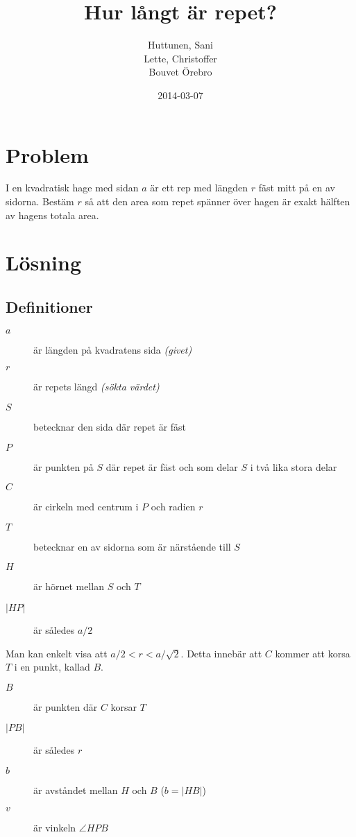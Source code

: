 \documentclass[10pt]{article}
\title{Hur långt är repet?}
\author{Huttunen, Sani\\Lette, Christoffer\\Bouvet Örebro}
\date{2014-03-07}
\begin{document}
  \maketitle

  \section*{Problem}

  I en kvadratisk hage med sidan $a$ är ett rep med längden
  $r$ fäst mitt på en av sidorna. Bestäm $r$ så att den area
  som repet spänner över hagen är exakt hälften av hagens totala area.

  \section*{Lösning}

  \subsection*{Definitioner}

  \begin{description}
    \item[$a$] är längden på kvadratens sida \emph{(givet)}
    \item[$r$] är repets längd \emph{(sökta värdet)}
    \item[$S$] betecknar den sida där repet är fäst
    \item[$P$] är punkten på $S$ där repet är fäst och som delar $S$ i två lika stora delar
    \item[$C$] är cirkeln med centrum i $P$ och radien $r$
    \item[$T$] betecknar en av sidorna som är närstående till $S$
    \item[$H$] är hörnet mellan $S$ och $T$
    \item[$|HP|$] är således $a/2$
  \end{description}

  Man kan enkelt visa att $a/2 < r < a/\sqrt{2}$. Detta innebär att $C$ kommer att korsa $T$ i en punkt, kallad $B$.

  \begin{description}
    \item[$B$] är punkten där $C$ korsar $T$
    \item[$|PB|$] är således $r$
    \item[$b$] är avståndet mellan $H$ och $B$ ($b = |HB|$)
    \item[$v$] är vinkeln $\angle HPB$
  \end{description}
\end{document}
